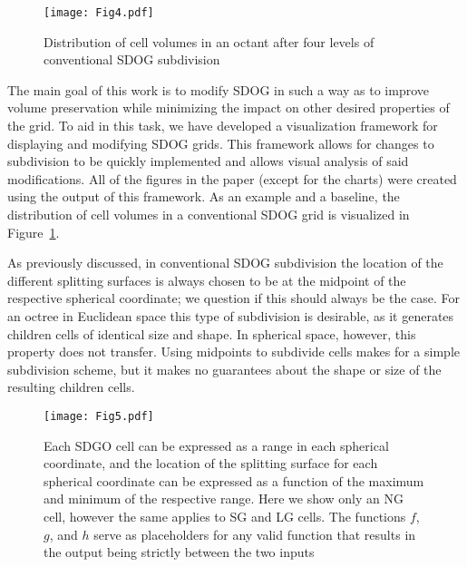 \begin{figure}[tbp]
	\texttt{[image: Fig4.pdf]}
	\caption{Distribution of cell volumes in an octant after four levels of conventional SDOG subdivision}
	\label{fig:sdog-vol}
\end{figure}


The main goal of this work is to modify SDOG in such a way as to improve volume preservation while minimizing the impact on other desired properties of the grid.
To aid in this task, we have developed a visualization framework for displaying and modifying SDOG grids.
This framework allows for changes to subdivision to be quickly implemented and allows visual analysis of said modifications.
All of the figures in the paper (except for the charts) were created using the output of this framework.
As an example and a baseline, the distribution of cell volumes in a conventional SDOG grid is visualized in Figure~\ref{fig:sdog-vol}.


As previously discussed, in conventional SDOG subdivision the location of the different splitting surfaces is always chosen to be at the midpoint of the respective spherical coordinate; we question if this should always be the case.
For an octree in Euclidean space this type of subdivision is desirable, as it generates children cells of identical size and shape.
In spherical space, however, this property does not transfer.
Using midpoints to subdivide cells makes for a simple subdivision scheme, but it makes no guarantees about the shape or size of the resulting children cells.


\begin{figure}[tbp]
	\texttt{[image: Fig5.pdf]}
	\caption{Each SDGO cell can be expressed as a range in each spherical coordinate, and the location of the splitting surface for each spherical coordinate can be expressed as a function of the maximum and minimum of the respective range.
		Here we show only an NG cell, however the same applies to SG and LG cells.
		The functions $f$, $g$, and $h$ serve as placeholders for any valid function that results in the output being strictly between the two inputs}
	\label{fig:functions}
\end{figure}


